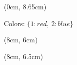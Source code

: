 \begin{textblock*}{8cm}(0cm, 8.65cm) %
  \begin{center}
    \small
    Colors: $\{1:red,\ 2:blue\}$
  \end{center}
\end{textblock*}

\begin{textblock*}{8cm}(8cm, 6cm) %
  \begin{center}

  \end{center}
\end{textblock*}

\begin{textblock*}{8cm}(8cm, 6.5cm) %

\end{textblock*}

